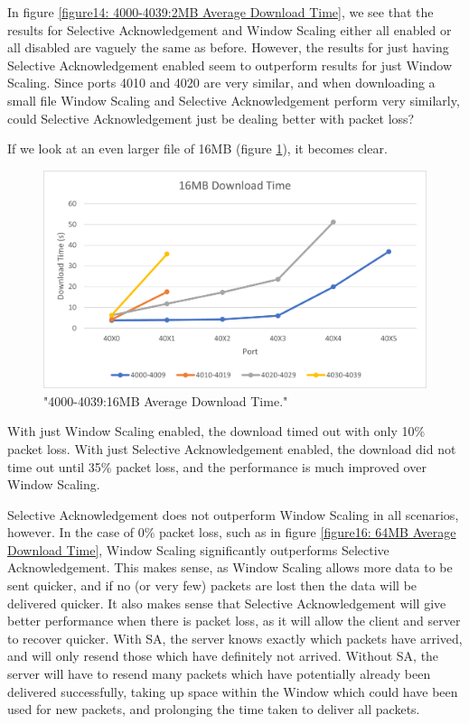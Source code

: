 \documentclass[12pt]{article}
\begin{document}
In figure \ref{figure14: 4000-4039:2MB Average Download Time}, we see that the results for Selective Acknowledgement and Window Scaling either all enabled or all disabled are vaguely the same as before.
However, the results for just having Selective Acknowledgement enabled seem to outperform results for just Window Scaling.
Since ports 4010 and 4020 are very similar, and when downloading a small file Window Scaling and Selective Acknowledgement perform very similarly, could Selective Acknowledgement just be dealing better with packet loss?

If we look at an even larger file of 16MB (figure \ref{figure15: 4000-4039:16MB Average Download Time}), it becomes clear.

\begin{figure}[!htbp]
  \centering
  \includegraphics[width=\linewidth]{4000-4039-16MB-download-time.png}
  \caption{"4000-4039:16MB Average Download Time."}
  \label{figure15: 4000-4039:16MB Average Download Time}
\end{figure}

With just Window Scaling enabled, the download timed out with only 10\% packet loss.
With just Selective Acknowledgement enabled, the download did not time out until 35\% packet loss, and the performance is much improved over Window Scaling.

Selective Acknowledgement does not outperform Window Scaling in all scenarios, however.
In the case of 0\% packet loss, such as in figure \ref{figure16: 64MB Average Download Time}, Window Scaling significantly outperforms Selective Acknowledgement.
This makes sense, as Window Scaling allows more data to be sent quicker, and if no (or very few) packets are lost then the data will be delivered quicker.
It also makes sense that Selective Acknowledgement will give better performance when there is packet loss, as it will allow the client and server to recover quicker.
With SA, the server knows exactly which packets have arrived, and will only resend those which have definitely not arrived.
Without SA, the server will have to resend many packets which have potentially already been delivered successfully, taking up space within the Window which could have been used for new packets, and prolonging the time taken to deliver all packets. 
\end{document}
